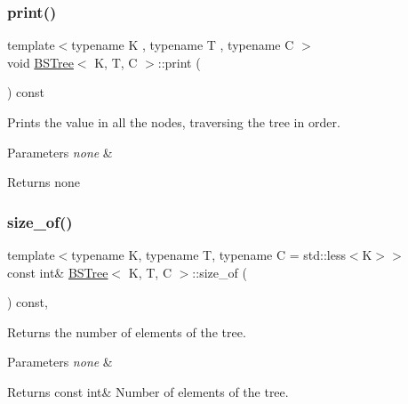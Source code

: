 \subsubsection{\texorpdfstring{print()}{print()}}
{\footnotesize\ttfamily template$<$typename K , typename T , typename C $>$ \\
void \hyperlink{class_b_s_tree}{B\+S\+Tree}$<$ K, T, C $>$\+::print (\begin{DoxyParamCaption}{ }\end{DoxyParamCaption}) const}



Prints the value in all the nodes, traversing the tree in order. 


\begin{DoxyParams}{Parameters}
{\em none} & \\
\hline
\end{DoxyParams}
\begin{DoxyReturn}{Returns}
none 
\end{DoxyReturn}
\mbox{\label{class_b_s_tree_a176f1ccfb16c72f653d27c0a8a02fbb5}} 
\subsubsection{\texorpdfstring{size\+\_\+of()}{size\_of()}}
{\footnotesize\ttfamily template$<$typename K, typename T, typename C = std\+::less$<$\+K$>$$>$ \\
const int\& \hyperlink{class_b_s_tree}{B\+S\+Tree}$<$ K, T, C $>$\+::size\+\_\+of (\begin{DoxyParamCaption}{ }\end{DoxyParamCaption}) const\hspace{0.3cm}{\ttfamily [inline]}, {\ttfamily [noexcept]}}



Returns the number of elements of the tree. 


\begin{DoxyParams}{Parameters}
{\em none} & \\
\hline
\end{DoxyParams}
\begin{DoxyReturn}{Returns}
const int\& Number of elements of the tree. 
\end{DoxyReturn}
\mbox{\label{class_b_s_tree_a8b5a7600d91dee310ece37c10cbceb6a}} 
